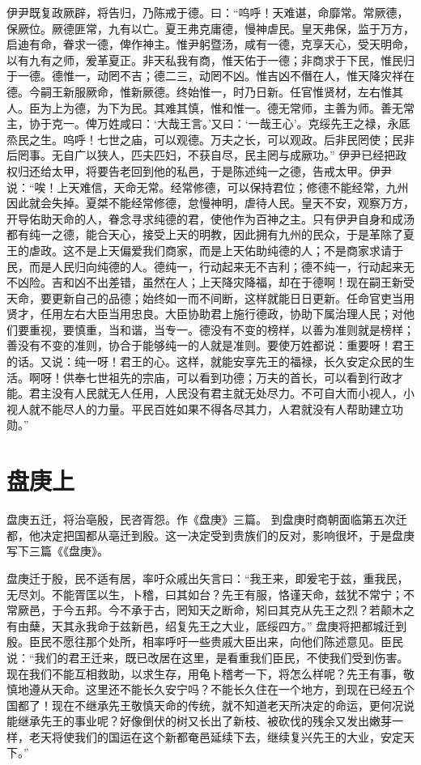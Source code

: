 \documentclass[a4paper,12pt,UTF8,twoside]{ctexbook}
\begin{document}
伊尹既复政厥辟，将告归，乃陈戒于德。曰：“呜呼！天难谌，命靡常。常厥德，保厥位。厥德匪常，九有以亡。夏王弗克庸德，慢神虐民。皇天弗保，监于万方，启迪有命，眷求一德，俾作神主。惟尹躬暨汤，咸有一德，克享天心，受天明命，以有九有之师，爰革夏正。非天私我有商，惟天佑于一德；非商求于下民，惟民归于一德。德惟一，动罔不吉；德二三，动罔不凶。惟吉凶不僭在人，惟天降灾祥在德。今嗣王新服厥命，惟新厥德。终始惟一，时乃日新。任官惟贤材，左右惟其人。臣为上为德，为下为民。其难其慎，惟和惟一。德无常师，主善为师。善无常主，协于克一。俾万姓咸曰：‘大哉王言。’又曰：‘一哉王心’。克绥先王之禄，永厎烝民之生。呜呼！七世之庙，可以观德。万夫之长，可以观政。后非民罔使；民非后罔事。无自广以狭人，匹夫匹妇，不获自尽，民主罔与成厥功。”
伊尹已经把政权归还给太甲，将要告老回到他的私邑，于是陈述纯一之德，告戒太甲。伊尹说：“唉！上天难信，天命无常。经常修德，可以保持君位；修德不能经常，九州因此就会失掉。夏桀不能经常修德，怠慢神明，虐待人民。皇天不安，观察万方，开导佑助天命的人，眷念寻求纯德的君，使他作为百神之主。只有伊尹自身和成汤都有纯一之德，能合天心，接受上天的明教，因此拥有九州的民众，于是革除了夏王的虐政。这不是上天偏爱我们商家，而是上天佑助纯德的人；不是商家求请于民，而是人民归向纯德的人。德纯一，行动起来无不吉利；德不纯一，行动起来无不凶险。吉和凶不出差错，虽然在人；上天降灾降福，却在于德啊！现在嗣王新受天命，要更新自己的品德；始终如一而不间断，这样就能日日更新。任命官吏当用贤才，任用左右大臣当用忠良。大臣协助君上施行德政，协助下属治理人民；对他们要重视，要慎重，当和谐，当专一。德没有不变的榜样，以善为准则就是榜样；善没有不变的准则，协合于能够纯一的人就是准则。要使万姓都说：重要呀！君王的话。又说：纯一呀！君王的心。这样，就能安享先王的福禄，长久安定众民的生活。啊呀！供奉七世祖先的宗庙，可以看到功德；万夫的首长，可以看到行政才能。君主没有人民就无人任用，人民没有君主就无处尽力。不可自大而小视人，小视人就不能尽人的力量。平民百姓如果不得各尽其力，人君就没有人帮助建立功勋。”

\chapter{盘庚上}

盘庚五迁，将治亳殷，民咨胥怨。作《盘庚》三篇。
到盘庚时商朝面临第五次迁都，他决定把国都从亳迁到殷。这一决定受到贵族们的反对，影响很坏，于是盘庚写下三篇《《盘庚》。

盘庚迁于殷，民不适有居，率吁众戚出矢言曰：“我王来，即爰宅于兹，重我民，无尽刘。不能胥匡以生，卜稽，曰其如台？先王有服，恪谨天命，兹犹不常宁；不常厥邑，于今五邦。今不承于古，罔知天之断命，矧曰其克从先王之烈？若颠木之有由蘖，天其永我命于兹新邑，绍复先王之大业，厎绥四方。”
盘庚将把都城迁到殷。臣民不愿往那个处所，相率呼吁一些贵戚大臣出来，向他们陈述意见。臣民说：“我们的君王迁来，既已改居在这里，是看重我们臣民，不使我们受到伤害。现在我们不能互相救助，以求生存，用龟卜稽考一下，将怎么样呢？先王有事，敬慎地遵从天命。这里还不能长久安宁吗？不能长久住在一个地方，到现在已经五个国都了！现在不继承先王敬慎天命的传统，就不知道老天所决定的命运，更何况说能继承先王的事业呢？好像倒伏的树又长出了新枝、被砍伐的残余又发出嫩芽一样，老天将使我们的国运在这个新都奄邑延续下去，继续复兴先王的大业，安定天下。”
\end{document}
